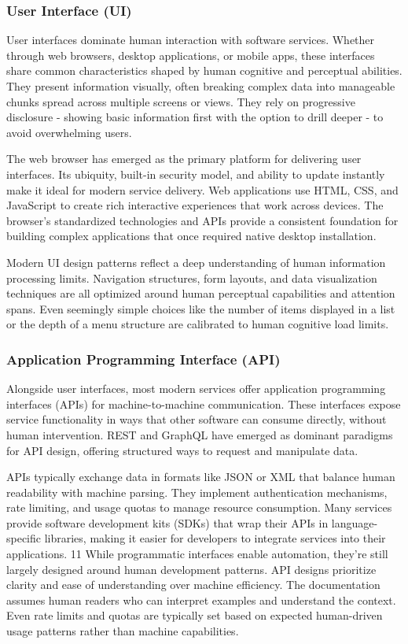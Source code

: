 \documentclass{article}
\begin{document}
\subsubsection{User Interface (UI)}
User interfaces dominate human interaction with software services. Whether through web browsers, desktop applications, or mobile apps, these interfaces share common characteristics shaped by human cognitive and perceptual abilities. They present information visually, often breaking complex data into manageable chunks spread across multiple screens or views. They rely on progressive disclosure - showing basic information first with the option to drill deeper - to avoid overwhelming users.

The web browser has emerged as the primary platform for delivering user interfaces. Its ubiquity, built-in security model, and ability to update instantly make it ideal for modern service delivery. Web applications use HTML, CSS, and JavaScript to create rich interactive experiences that work across devices. The browser's standardized technologies and APIs provide a consistent foundation for building complex applications that once required native desktop installation.

Modern UI design patterns reflect a deep understanding of human information processing limits. Navigation structures, form layouts, and data visualization techniques are all optimized around human perceptual capabilities and attention spans. Even seemingly simple choices like the number of items displayed in a list or the depth of a menu structure are calibrated to human cognitive load limits.

\subsubsection{Application Programming Interface (API)}
Alongside user interfaces, most modern services offer application programming interfaces (APIs) for machine-to-machine communication. These interfaces expose service functionality in ways that other software can consume directly, without human intervention. REST and GraphQL have emerged as dominant paradigms for API design, offering structured ways to request and manipulate data.

APIs typically exchange data in formats like JSON or XML that balance human readability with machine parsing. They implement authentication mechanisms, rate limiting, and usage quotas to manage resource consumption. Many services provide software development kits (SDKs) that wrap their APIs in language-specific libraries, making it easier for developers to integrate services into their applications.
11
While programmatic interfaces enable automation, they're still largely designed around human development patterns. API designs prioritize clarity and ease of understanding over machine efficiency. The documentation assumes human readers who can interpret examples and understand the context. Even rate limits and quotas are typically set based on expected human-driven usage patterns rather than machine capabilities.
\end{document}
